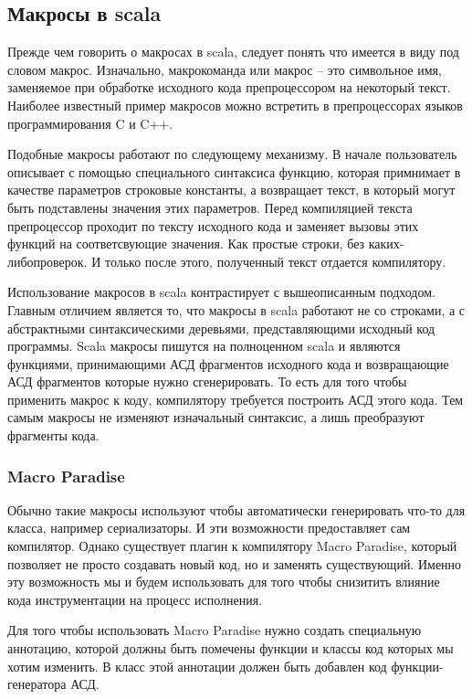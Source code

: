 \subsection{Макросы в scala}
\label{sec:macroScala}

Прежде чем говорить о макросах в scala, следует понять что имеется в виду под словом макрос.
Изначально, макрокоманда или макрос -- это символьное имя,
заменяемое при обработке исходного кода препроцессором на некоторый текст.
Наиболее известный пример макросов можно встретить в препроцессорах языков
программирования C и C++.

Подобные макросы работают по следующему механизму.
В начале пользователь описывает с помощью специального синтаксиса функцию,
которая примнимает в качестве параметров строковые константы, а возвращает текст,
в который могут быть подставлены значения этих параметров.
Перед компиляцией текста препроцессор проходит по тексту исходного кода и заменяет
вызовы этих функций на соответсвующие значения.
Как простые строки, без каких-либопроверок.
И только после этого, полученный текст отдается компилятору.

Использование макросов в scala контрастирует с вышеописанным подходом.
Главным отличием является то, что макросы в scala работают не со строками,
а с абстрактными синтаксическими деревьями, представляющими исходный код
программы.
Scala макросы пишутся на полноценном scala и являются функциями, принимающими
АСД фрагментов исходного кода и возвращающие АСД фрагментов которые нужно
сгенерировать.
То есть для того чтобы применить макрос к коду, компилятору требуется построить
АСД этого кода. Тем самым макросы не изменяют изначальный синтаксис, а лишь
преобразуют фрагменты кода.

\subsubsection{Macro Paradise}

Обычно такие макросы используют чтобы автоматически генерировать что-то для
класса, например сериализаторы.
И эти возможности предоставляет сам компилятор.
Однако существует плагин к компилятору Macro Paradise, который позволяет не
просто создавать новый код, но и заменять существующий.
Именно эту возможность мы и будем использовать для того чтобы снизитить влияние
кода инструментации на процесс исполнения.

Для того чтобы использовать Macro Paradise нужно создать специальную аннотацию,
которой должны быть помечены функции и классы код которых мы хотим изменить.
В класс этой аннотации должен быть добавлен код функции-генератора АСД.

